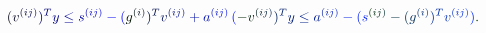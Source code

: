 \documentclass[12pt]{article}
\begin{document}
\makeatletter
\renewcommand*{\@textcolor}[3]{%
  \protect\leavevmode
  \begingroup
    \color#1{#2}#3%
  \endgroup
}
\makeatother
\begin{displaymath}
\mathcolor[RGB]{0,0,15}{(} \mathcolor[RGB]{0,0,30}{v} ^ { \mathcolor[RGB]{0,0,45}{(} \mathcolor[RGB]{0,0,60}{i} \mathcolor[RGB]{0,0,75}{j} \mathcolor[RGB]{0,0,90}{)} } \mathcolor[RGB]{0,0,105}{)} ^ { \mathcolor[RGB]{0,0,120}{T} } \mathcolor[RGB]{0,0,135}{y} \mathcolor[RGB]{0,0,150}{\leq} \mathcolor[RGB]{0,0,165}{s} ^ { \mathcolor[RGB]{0,0,180}{(} \mathcolor[RGB]{0,0,195}{i} \mathcolor[RGB]{0,0,210}{j} \mathcolor[RGB]{0,0,225}{)} } \mathcolor[RGB]{0,0,240}{-} \mathcolor[RGB]{0,0,255}{(} \mathcolor[RGB]{0,15,0}{g} ^ { \mathcolor[RGB]{0,15,15}{(} \mathcolor[RGB]{0,15,30}{i} \mathcolor[RGB]{0,15,45}{)} } \mathcolor[RGB]{0,15,60}{)} ^ { \mathcolor[RGB]{0,15,75}{T} } \mathcolor[RGB]{0,15,90}{v} ^ { \mathcolor[RGB]{0,15,105}{(} \mathcolor[RGB]{0,15,120}{i} \mathcolor[RGB]{0,15,135}{j} \mathcolor[RGB]{0,15,150}{)} } \mathcolor[RGB]{0,15,165}{+} \mathcolor[RGB]{0,15,180}{a} ^ { \mathcolor[RGB]{0,15,195}{(} \mathcolor[RGB]{0,15,210}{i} \mathcolor[RGB]{0,15,225}{j} \mathcolor[RGB]{0,15,240}{)} } \, \mathcolor[RGB]{0,15,255}{(} \mathcolor[RGB]{0,30,0}{-} \mathcolor[RGB]{0,30,15}{v} ^ { \mathcolor[RGB]{0,30,30}{(} \mathcolor[RGB]{0,30,45}{i} \mathcolor[RGB]{0,30,60}{j} \mathcolor[RGB]{0,30,75}{)} } \mathcolor[RGB]{0,30,90}{)} ^ { \mathcolor[RGB]{0,30,105}{T} } \mathcolor[RGB]{0,30,120}{y} \mathcolor[RGB]{0,30,135}{\leq} \mathcolor[RGB]{0,30,150}{a} ^ { \mathcolor[RGB]{0,30,165}{(} \mathcolor[RGB]{0,30,180}{i} \mathcolor[RGB]{0,30,195}{j} \mathcolor[RGB]{0,30,210}{)} } \mathcolor[RGB]{0,30,225}{-} \mathcolor[RGB]{0,30,240}{(} \mathcolor[RGB]{0,30,255}{s} ^ { \mathcolor[RGB]{0,45,0}{(} \mathcolor[RGB]{0,45,15}{i} \mathcolor[RGB]{0,45,30}{j} \mathcolor[RGB]{0,45,45}{)} } \mathcolor[RGB]{0,45,60}{-} \mathcolor[RGB]{0,45,75}{(} \mathcolor[RGB]{0,45,90}{g} ^ { \mathcolor[RGB]{0,45,105}{(} \mathcolor[RGB]{0,45,120}{i} \mathcolor[RGB]{0,45,135}{)} } \mathcolor[RGB]{0,45,150}{)} ^ { \mathcolor[RGB]{0,45,165}{T} } \mathcolor[RGB]{0,45,180}{v} ^ { \mathcolor[RGB]{0,45,195}{(} \mathcolor[RGB]{0,45,210}{i} \mathcolor[RGB]{0,45,225}{j} \mathcolor[RGB]{0,45,240}{)} } \mathcolor[RGB]{0,45,255}{)} \mathcolor[RGB]{0,60,0}{.}
\end{displaymath}
\end{document}
